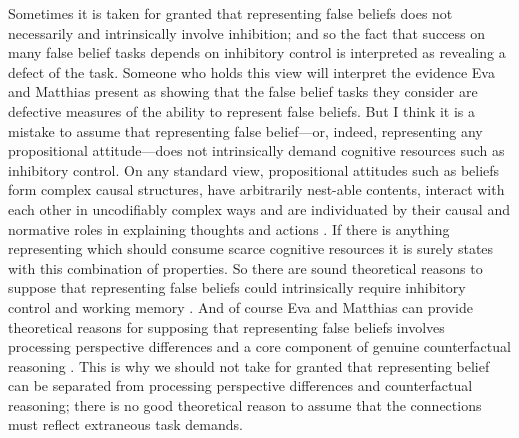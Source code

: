 \documentclass[12pt,\papersize]{extarticle}
\begin{document}
Sometimes it is taken for granted that representing false beliefs does not necessarily and intrinsically involve inhibition;
and so the fact that success on many false belief tasks depends on inhibitory control is interpreted as revealing a defect of the task.
Someone who holds this view will interpret the evidence Eva and Matthias present as showing that the false belief tasks they consider are defective measures of the ability to represent false beliefs.
But I think it is a mistake to assume that representing false belief---or, indeed, representing any propositional attitude---does not intrinsically demand cognitive resources such as inhibitory control.
On any standard view, propositional attitudes such as beliefs form complex causal structures, have arbitrarily nest-able contents, interact with each other in uncodifiably complex ways and are individuated by their causal and normative roles in explaining thoughts and actions \citep[]{en_809, en_249}.  
If there is anything representing which should consume scarce cognitive resources it is surely states with this combination of properties.
So there are sound theoretical reasons to suppose that representing false beliefs could intrinsically require inhibitory control and working memory \citep[see also][]{Russell:1999vr}.
And of course Eva and Matthias can provide theoretical reasons for supposing that representing false beliefs involves processing perspective differences and a core component of genuine counterfactual reasoning \citep{perner:2007_objects}. 
This is why we should not take for granted that representing belief can be separated from processing perspective differences and counterfactual reasoning; there is no good theoretical reason to assume that the connections must reflect extraneous task demands. 
\end{document}
